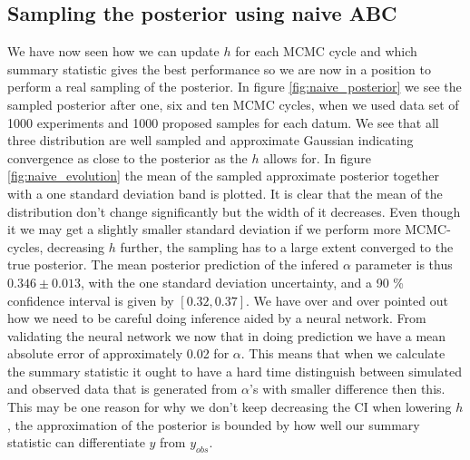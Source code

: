 \documentclass[11pt,a4paper]{article}
\begin{document}
\subsection{Sampling the posterior using naive ABC}
\label{sec:naive_posterior}
We have now seen how we can update $h$ for each MCMC cycle and which summary statistic gives the best performance so we are now in a position to perform a real sampling of the posterior. In figure \ref{fig:naive_posterior} we see the sampled posterior after one, six and ten MCMC cycles, when we used data set of 1000 experiments and 1000 proposed samples for each datum. We see that all three distribution are well sampled and approximate Gaussian indicating convergence as close to the posterior as the $h$ allows for. In figure \ref{fig:naive_evolution} the mean of the sampled approximate posterior together with a one standard deviation band is plotted. It is clear that the mean of the distribution don't change significantly but the width of it decreases. Even though it we may get a slightly smaller standard deviation if we perform more MCMC-cycles, decreasing $h$ further, the sampling has to a large extent converged to the true posterior. The mean posterior prediction of the infered $\alpha$ parameter is thus $0.346\pm 0.013$, with the one standard deviation uncertainty, and a 90 \% confidence interval is given by $[0.32, 0.37]$. We have over and over pointed out how we need to be careful doing inference aided by a neural network. From validating the neural network we now that in doing prediction we have a mean absolute error of approximately 0.02 for $\alpha$. This means that when we calculate the summary statistic it ought to have a hard time distinguish between simulated and observed data that is generated from $\alpha$'s with smaller difference then this. This may be one reason for why we don't keep decreasing the CI when lowering $h$, the approximation of the posterior is bounded by how well our summary statistic can differentiate $y$ from $y_{obs}$. 
\end{document}
